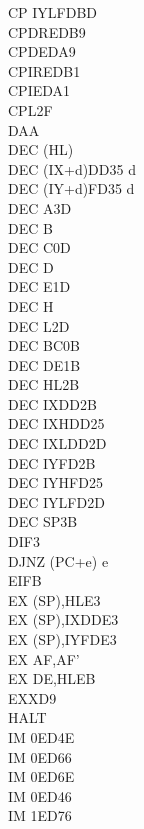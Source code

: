 \begin{multicols}{3}
{\begin{tabbing}
        CP IYL\UNDOC\>FDBD\\
        CPDR\>EDB9\\
        CPD\>EDA9\\
        CPIR\>EDB1\\
        CPI\>EDA1\\
        CPL\>2F\\
        DAA\\
        DEC (HL)\\
        DEC (IX+d)\>DD35 d\\
        DEC (IY+d)\>FD35 d\\
        DEC A\>3D\\
        DEC B\\
        DEC C\>0D\\
        DEC D\\
        DEC E\>1D\\
        DEC H\\
        DEC L\>2D\\
        DEC BC\>0B\\
        DEC DE\>1B\\
        DEC HL\>2B\\
        DEC IX\>DD2B\\
        DEC IXH\UNDOC\>DD25\\
        DEC IXL\UNDOC\>DD2D\\
        DEC IY\>FD2B\\
        DEC IYH\UNDOC\>FD25\\
        DEC IYL\UNDOC\>FD2D\\
        DEC SP\>3B\\
        DI\>F3\\
        DJNZ (PC+e) e\\
        EI\>FB\\
        EX (SP),HL\>E3\\
        EX (SP),IX\>DDE3\\
        EX (SP),IY\>FDE3\\
        EX AF,AF'\\
        EX DE,HL\>EB\\
        EXX\>D9\\
        HALT\\
        IM 0\UNDOC\>ED4E\\
        IM 0\UNDOC\>ED66\\
        IM 0\UNDOC\>ED6E\\
        IM 0\>ED46\\
        IM 1\UNDOC\>ED76\\

\end{tabbing}}
\end{multicols}
